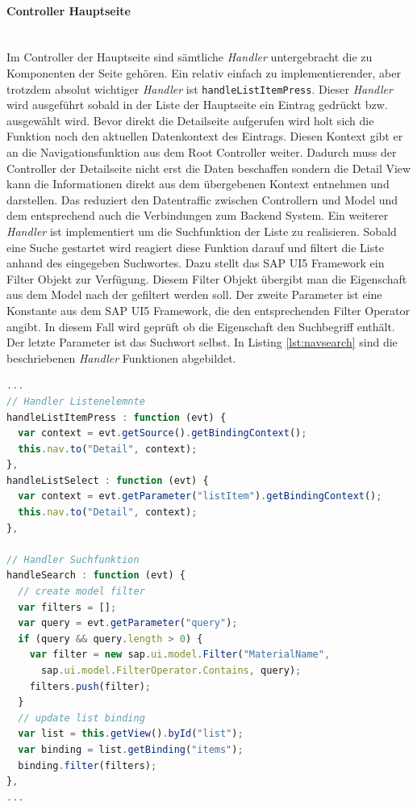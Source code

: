 \paragraph{Controller Hauptseite}$\;$ \\
Im Controller der Hauptseite sind sämtliche \textit{Handler} untergebracht die zu Komponenten der Seite gehören. Ein relativ einfach zu implementierender, aber trotzdem absolut wichtiger \textit{Handler} ist \texttt{handleListItemPress}. Dieser \textit{Handler} wird ausgeführt sobald in der Liste der Hauptseite ein Eintrag gedrückt bzw. ausgewählt wird. Bevor direkt die Detailseite aufgerufen wird holt sich die Funktion noch den aktuellen Datenkontext des Eintrags. Diesen Kontext gibt er an die Navigationsfunktion aus dem Root Controller weiter. Dadurch muss der Controller der Detailseite nicht erst die Daten beschaffen sondern die Detail View kann die Informationen direkt aus dem übergebenen Kontext entnehmen und darstellen. Das reduziert den Datentraffic zwischen Controllern und Model und dem entsprechend auch die Verbindungen zum Backend System. Ein weiterer \textit{Handler} ist implementiert um die Suchfunktion der Liste zu realisieren. Sobald eine Suche gestartet wird reagiert diese Funktion darauf und filtert die Liste anhand des eingegeben Suchwortes. Dazu stellt das SAP UI5 Framework ein Filter Objekt zur Verfügung. Diesem Filter Objekt übergibt man die Eigenschaft aus dem Model nach der gefiltert werden soll. Der zweite Parameter ist eine Konstante aus dem SAP UI5 Framework, die den entsprechenden Filter Operator angibt. In diesem Fall wird geprüft ob die Eigenschaft den Suchbegriff enthält. Der letzte Parameter ist das Suchwort selbst. In Listing \ref{lst:navsearch} sind die beschriebenen \textit{Handler} Funktionen abgebildet.

\vspace{1em}
\begin{lstlisting}[language=JavaScript, caption=Navigation und Suchfunktion der Hauptseite, label=lst:navsearch]
...  
// Handler Listenelemnte
handleListItemPress : function (evt) {
  var context = evt.getSource().getBindingContext();
  this.nav.to("Detail", context);
},
handleListSelect : function (evt) {
  var context = evt.getParameter("listItem").getBindingContext();
  this.nav.to("Detail", context);
},
  
// Handler Suchfunktion
handleSearch : function (evt) {		
  // create model filter
  var filters = [];
  var query = evt.getParameter("query");
  if (query && query.length > 0) {
    var filter = new sap.ui.model.Filter("MaterialName",
      sap.ui.model.FilterOperator.Contains, query);
    filters.push(filter);
  }	
  // update list binding
  var list = this.getView().byId("list");
  var binding = list.getBinding("items");
  binding.filter(filters);
},
...
\end{lstlisting}

